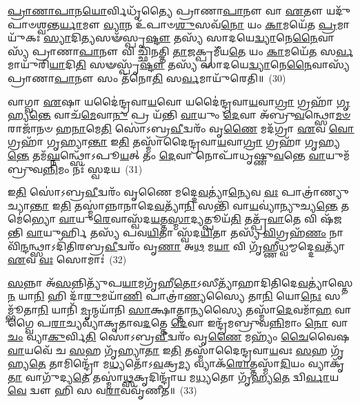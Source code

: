 \-\ul{𑌪𑍍𑌰𑌾}\-\-\ul{𑌣𑌾}\-\-\ul{𑌪𑌾}\-𑌨\-\ul{𑌯𑍋}\-𑌰𑍍𑌵𑌿𑌧𑍃᳴𑌤𑍍𑌯𑍈 𑌪𑍍𑌰𑌾𑌣𑌾\-\ul{𑌪𑌾}\-𑌨𑍗 𑌵𑌾 \ul{𑌏}\-𑌤𑍗 𑌯𑌦𑍁᳴𑌪𑌾𑍞𑌶𑍍𑌵𑌨𑍍𑌤\-\ul{𑌰𑍍𑌯𑌾}\-𑌮𑍗 \ul{𑌵𑍍𑌯𑌾}\-𑌨 𑌉᳴𑌪𑌾𑍞\-\ul{𑌶𑍁}\-𑌸𑌵᳴\-\ul{𑌨𑍋} 𑌯𑌂 \ul{𑌕𑌾}\-𑌮𑌯𑍇᳴𑌤 \ul{𑌪𑍍𑌰}\-𑌮𑌾𑌯𑍁᳴𑌕𑌃 \ul{𑌸𑍍𑌯𑌾}\-𑌦𑌿𑌤𑍍𑌯𑌸𑍟᳴𑌸𑍍𑌪𑍃\-\ul{𑌷𑍍𑌟𑍗} 𑌤𑌸𑍍𑌯᳴ 𑌸𑌾𑌦𑌯𑍇\-\ul{𑌦𑍍𑌵𑍍𑌯𑌾}\-𑌨𑍇\-\ul{𑌨𑍈}\-𑌵𑌾𑌸𑍍𑌯᳴ 𑌪𑍍𑌰𑌾𑌣𑌾\-\ul{𑌪𑌾}\-𑌨𑍗 𑌵𑌿 𑌚𑍍𑌛𑌿᳴𑌨𑌤𑍍𑌤𑌿 \ul{𑌤𑌾}\-𑌜𑌕𑍍𑌪𑍍𑌰𑌮𑍀᳴𑌯\-\ul{𑌤𑍇} 𑌯𑌂 \ul{𑌕𑌾}\-𑌮𑌯𑍇᳴\-\ul{𑌤} 𑌸\-\ul{𑌰𑍍𑌵}\-𑌮𑌾𑌯𑍁᳴𑌰𑌿\-\ul{𑌯𑌾}\-𑌦𑌿\-\ul{𑌤𑌿} 𑌸𑍟𑌸𑍍𑌪𑍃᳴\-\ul{𑌷𑍍𑌟𑍗} 𑌤𑌸𑍍𑌯᳴ 𑌸𑌾𑌦𑌯𑍇\-\ul{𑌦𑍍𑌵𑍍𑌯𑌾}\-𑌨𑍇\-\ul{𑌨𑍈}\-𑌵𑌾𑌸𑍍𑌯᳴ 𑌪𑍍𑌰𑌾𑌣𑌾\-\ul{𑌪𑌾}\-𑌨𑍗 𑌸𑌂 𑌤᳴𑌨𑍋\-\ul{𑌤𑌿} 𑌸\-\ul{𑌰𑍍𑌵}\-𑌮𑌾𑌯𑍁᳴𑌰𑍇𑌤𑌿॥~(30)

{\anuvakamend[{\-\ul{𑌤} \ul{𑌉}\-𑌭𑌯𑌾॑𑌨𑍍𑌗𑍃𑌹𑍍𑌯\-\ul{𑌤𑍇} 𑌚𑌤𑍁᳴𑌶𑍍𑌚𑌤𑍍𑌵𑌾𑌰𑌿𑍞𑌶𑌚𑍍𑌚}]}%

𑌵𑌾𑌗𑍍𑌵𑌾 \ul{𑌏}\-𑌷𑌾 𑌯𑌦𑍈॑𑌨𑍍𑌦𑍍𑌰𑌵𑌾\-\ul{𑌯}\-𑌵𑍋 𑌯𑌦𑍈॑𑌨𑍍𑌦𑍍𑌰𑌵𑌾\-\ul{𑌯}\-𑌵𑌾\-\ul{𑌗𑍍𑌰𑌾} 𑌗𑍍𑌰𑌹𑌾᳴ \ul{𑌗𑍃}\-𑌹𑍍𑌯\-\ul{𑌨𑍍𑌤𑍇} 𑌵𑌾𑌚᳴\-\ul{𑌮𑍇}\-𑌵𑌾\-\ul{𑌨𑍁} 𑌪𑍍𑌰 𑌯᳴𑌨𑍍𑌤𑌿 \ul{𑌵𑌾}\-𑌯𑍁𑌂 \ul{𑌦𑍇}\-𑌵𑌾 𑌅᳴𑌬𑍍𑌰𑍁\-\ul{𑌵}\-𑌨𑍍𑌥𑍍𑌸𑍋\-\ul{𑌮}\-\-\ul{𑍞} 𑌰𑌾𑌜𑌾᳴𑌨𑍞 𑌹\-\ul{𑌨𑌾}\-𑌮𑍇\-\ul{𑌤𑌿} 𑌸𑍋॑\-𑌽𑌬𑍍𑌰\-\ul{𑌵𑍀}\-𑌦𑍍𑌵𑌰𑌂᳴ 𑌵𑍃\-\ul{𑌣𑍈} 𑌮𑌦᳴𑌗𑍍𑌰𑌾 \ul{𑌏}\-𑌵 \ul{𑌵𑍋} 𑌗𑍍𑌰𑌹𑌾᳴ 𑌗𑍃𑌹𑍍𑌯𑌾\-\ul{𑌨𑍍𑌤𑌾} 𑌇\-\ul{𑌤𑌿} 𑌤𑌸𑍍𑌮𑌾᳴𑌦𑍈𑌨𑍍𑌦𑍍𑌰𑌵𑌾\-\ul{𑌯}\-𑌵𑌾\-\ul{𑌗𑍍𑌰𑌾} 𑌗𑍍𑌰𑌹𑌾᳴ 𑌗𑍃𑌹𑍍𑌯\-\ul{𑌨𑍍𑌤𑍇} 𑌤𑌮᳴\-\ul{𑌘𑍍𑌨}\-𑌨𑍍𑌥𑍍𑌸𑍋᳴\-𑌽𑌪𑍂\-\ul{𑌯}\-𑌤𑍍 𑌤𑌂 \ul{𑌦𑍇}\-𑌵𑌾 𑌨𑍋𑌪𑌾᳴𑌧𑍃𑌷𑍍𑌣𑍁\-\ul{𑌵}\-𑌨𑍍𑌤𑍇 \ul{𑌵𑌾}\-𑌯𑍁𑌮᳴𑌬𑍍𑌰𑍁𑌵\-\ul{𑌨𑍍𑌨𑌿}\-𑌮𑌂 𑌨𑌃᳴ 𑌸𑍍𑌵𑌦𑌯~(31)

𑌇\-\ul{𑌤𑌿} 𑌸𑍋॑\-𑌽𑌬𑍍𑌰\-\ul{𑌵𑍀}\-𑌦𑍍𑌵𑌰𑌂᳴ 𑌵𑍃𑌣𑍈 𑌮𑌦𑍍𑌦𑍇\-\ul{𑌵}\-𑌤𑍍𑌯𑌾॑\-\ul{𑌨𑍍𑌯𑍇}\-𑌵 \ul{𑌵𑌃} 𑌪𑌾𑌤𑍍𑌰𑌾॑𑌣𑍍𑌯𑍁𑌚𑍍𑌯𑌾\-\ul{𑌨𑍍𑌤𑌾} 𑌇\-\ul{𑌤𑌿} 𑌤𑌸𑍍𑌮𑌾॑𑌨𑍍𑌨𑌾𑌨𑌾𑌦𑍇\-\ul{𑌵}\-𑌤𑍍𑌯𑌾᳴\-\ul{𑌨𑌿} 𑌸𑌨𑍍𑌤𑌿᳴ 𑌵𑌾\-\ul{𑌯}\-𑌵𑍍𑌯𑌾॑𑌨𑍍𑌯𑍁𑌚𑍍𑌯\-\ul{𑌨𑍍𑌤𑍇} 𑌤𑌮𑍇॑𑌭𑍍𑌯𑍋 \ul{𑌵𑌾}\-𑌯𑍁\-\ul{𑌰𑍇}\-𑌵𑌾𑌸𑍍𑌵᳴𑌦\-\ul{𑌯}\-𑌤𑍍𑌤\-\ul{𑌸𑍍𑌮𑌾}\-𑌦𑍍𑌯𑌤𑍍𑌪𑍂𑌯᳴\-\ul{𑌤𑌿} 𑌤𑌤𑍍𑌪𑍍𑌰᳴\-\ul{𑌵𑌾}\-𑌤𑍇 𑌵𑌿 𑌷᳴𑌜𑌨𑍍𑌤𑌿 \ul{𑌵𑌾}\-𑌯𑍁𑌰𑍍\mbox{}𑌹𑌿 𑌤𑌸𑍍𑌯᳴ 𑌪𑌵\-\ul{𑌯𑌿}\-𑌤𑌾 𑌸𑍍𑌵᳴𑌦\-\ul{𑌯𑌿}\-𑌤𑌾 𑌤𑌸𑍍𑌯᳴ \ul{𑌵𑌿}\-𑌗𑍍𑌰𑌹᳴\-\ul{𑌣𑌂} 𑌨𑌾𑌵𑌿᳴\-\ul{𑌨𑍍𑌦}\-𑌨𑍍𑌥𑍍𑌸𑌾\-𑌽𑌦𑌿᳴𑌤𑌿𑌰𑌬𑍍𑌰\-\ul{𑌵𑍀}\-𑌦𑍍𑌵𑌰𑌂᳴ 𑌵𑍃\-\ul{𑌣𑌾} 𑌅\-\ul{𑌥} 𑌮\-\ul{𑌯𑌾} 𑌵𑌿 𑌗𑍃᳴𑌹𑍍𑌣𑍀𑌧𑍍𑌵𑌮𑍍𑌮𑌦𑍍𑌦𑍇\-\ul{𑌵}\-𑌤𑍍𑌯𑌾᳴ \ul{𑌏}\-𑌵 \ul{𑌵𑌃} 𑌸𑍋𑌮𑌾𑌃॑~(32)

\-\ul{𑌸}\-𑌨𑍍𑌨𑌾 𑌅᳴\-\ul{𑌸}\-𑌨𑍍𑌨𑌿𑌤𑍍𑌯𑍁᳴𑌪\-\ul{𑌯𑌾}\-𑌮𑌗𑍃᳴𑌹𑍀\-\ul{𑌤𑍋}\-\-𑌽𑌸𑍀𑌤𑍍𑌯𑌾᳴𑌹𑌾𑌦𑌿𑌤𑌿𑌦𑍇\-\ul{𑌵}\-𑌤𑍍𑌯𑌾॑𑌸𑍍𑌤𑍇\-\ul{𑌨} 𑌯𑌾\-\ul{𑌨𑌿} 𑌹𑌿 𑌦𑌾᳴\-\ul{𑌰𑍁}\-𑌮𑌯𑌾᳴\-\ul{𑌣𑌿} 𑌪𑌾𑌤𑍍𑌰𑌾॑\-\ul{𑌣𑍍𑌯}\-𑌸𑍍𑌯𑍈 𑌤𑌾\-\ul{𑌨𑌿} 𑌯𑍋\-\ul{𑌨𑍇𑌃} 𑌸𑌮𑍍𑌭𑍂᳴𑌤𑌾\-\ul{𑌨𑌿} 𑌯𑌾𑌨𑌿᳴ \ul{𑌮𑍃}\-𑌨𑍍𑌮𑌯𑌾᳴𑌨𑌿 \ul{𑌸𑌾}\-𑌕𑍍𑌷𑌾𑌤𑍍𑌤𑌾\-\ul{𑌨𑍍𑌯}\-𑌸𑍍𑌯𑍈 𑌤𑌸𑍍𑌮𑌾᳴\-\ul{𑌦𑍇}\-𑌵𑌮𑌾᳴\-\ul{𑌹} 𑌵𑌾𑌗𑍍𑌵𑍈 𑌪\-\ul{𑌰𑌾}\-𑌚𑍍𑌯𑌵𑍍𑌯𑌾᳴𑌕𑍃𑌤𑌾𑌵\-\ul{𑌦}\-𑌤𑍍𑌤𑍇 \ul{𑌦𑍇}\-𑌵𑌾 𑌇𑌨𑍍𑌦𑍍𑌰᳴𑌮𑌬𑍍𑌰𑍁𑌵\-\ul{𑌨𑍍𑌨𑌿}\-𑌮𑌾𑌂 \ul{𑌨𑍋} 𑌵𑌾\-\ul{𑌚𑌂} 𑌵𑍍𑌯𑌾\-\ul{𑌕𑍁}\-𑌰𑍍𑌵𑌿\-\ul{𑌤𑌿} 𑌸𑍋॑\-𑌽𑌬𑍍𑌰\-\ul{𑌵𑍀}\-𑌦𑍍𑌵𑌰𑌂᳴ 𑌵𑍃\-\ul{𑌣𑍈} 𑌮𑌹𑍍𑌯𑌂᳴ \ul{𑌚𑍈}\-𑌵𑍈𑌷 \ul{𑌵𑌾}\-𑌯𑌵𑍇᳴ 𑌚 \ul{𑌸}\-𑌹 𑌗𑍃᳴𑌹𑍍𑌯𑌾\-\ul{𑌤𑌾} 𑌇\-\ul{𑌤𑌿} 𑌤𑌸𑍍𑌮𑌾᳴𑌦𑍈𑌨𑍍𑌦𑍍𑌰𑌵𑌾\-\ul{𑌯}\-𑌵𑌃 \ul{𑌸}\-𑌹 𑌗𑍃᳴𑌹𑍍𑌯\-\ul{𑌤𑍇} 𑌤𑌾𑌮𑌿𑌨𑍍𑌦𑍍𑌰𑍋᳴ 𑌮\-\ul{𑌧𑍍𑌯}\-𑌤𑍋᳴\-𑌽\-\ul{𑌵}\-𑌕𑍍𑌰\-\ul{𑌮𑍍𑌯} 𑌵𑍍𑌯𑌾𑌕᳴\-\ul{𑌰𑍋}\-𑌤𑍍𑌤𑌸𑍍𑌮𑌾᳴\-\ul{𑌦𑌿}\-𑌯𑌂 𑌵𑍍𑌯𑌾𑌕𑍃᳴\-\ul{𑌤𑌾} 𑌵𑌾𑌗𑍁᳴𑌦𑍍𑌯\-\ul{𑌤𑍇} 𑌤𑌸𑍍𑌮𑌾॑\-\ul{𑌥𑍍𑌸}\-𑌕𑍃𑌦𑌿𑌨𑍍𑌦𑍍𑌰𑌾᳴𑌯 𑌮\-\ul{𑌧𑍍𑌯}\-𑌤𑍋 𑌗𑍃᳴𑌹𑍍𑌯\-\ul{𑌤𑍇} 𑌦𑍍𑌵𑌿\-\ul{𑌰𑍍𑌵𑌾}\-𑌯\-\ul{𑌵𑍇} 𑌦𑍍𑌵𑍗 𑌹𑌿 𑌸 𑌵\-\ul{𑌰𑌾}\-𑌵𑌵𑍃᳴𑌣𑍀𑌤॥~(33)

